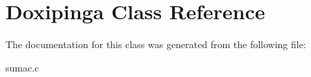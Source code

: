 \hypertarget{class_doxipinga}{\section{Doxipinga Class Reference}
\label{class_doxipinga}
}


The documentation for this class was generated from the following file\+:\begin{DoxyCompactItemize}
\item 
sumac.\+c\end{DoxyCompactItemize}
